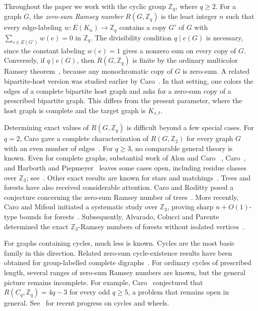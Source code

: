﻿\documentclass[11pt]{article}
\numberwithin{equation}{section}
\theoremstyle{remark}
\newcommand{\Z}{\mathbb Z}
\begin{document}
Throughout the paper we work with the cyclic group \(\Z_q\), where \(q\ge2\).
For a graph \(G\), the \emph{zero-sum Ramsey number} \(R(G,\Z_q)\) is the least integer \(n\) such that every edge-labeling $w\colon E(K_n)\to \Z_q$ contains a copy \(G'\) of \(G\) with $\sum_{e\in E(G')}w(e)=0$ in $\Z_q$.
The divisibility condition $q\mid e(G)$ is necessary, since the constant labeling $w(e)=1$ gives a nonzero sum on every copy of $G$.
Conversely, if \(q\mid e(G)\), then \(R(G,\Z_q)\) is finite by the ordinary multicolor Ramsey theorem~\cite{Ramsey1930}, because any monochromatic copy of \(G\) is zero-sum. 
A related bipartite-host version was studied earlier by Caro~\cite{Caro1993Bipartite}. In that setting, one colors the edges of a complete bipartite host graph and asks for a zero-sum copy of a prescribed bipartite graph. This differs from the present parameter, where the host graph is complete and the target graph is \(K_{s,t}\).


Determining exact values of \(R(G,\Z_q)\) is difficult beyond a few special cases.
For $q=2$, Caro gave a complete
characterization of \(R(G,\Z_2)\) for every graph \(G\) with an even number of edges~\cite{Caro1994}.
For \(q\ge3\), no comparable general theory is known.
Even for complete graphs, substantial work of Alon and Caro~\cite{AlonCaro1993} , Caro~\cite{Caro1992Complete,Caro1997}, and Harborth and Piepmeyer~\cite{HarborthPiepmeyer1994,HarborthPiepmeyer1996} leaves some cases open, including residue classes over \(\Z_3\); see~\cite{CaroMifsud2025}.
Other exact results are known for stars and matchings~\cite{BD1992,Caro1992Stars}. 
Trees and forests have also received considerable attention.
Caro and Roditty posed a conjecture concerning the zero-sum Ramsey number of trees~\cite{CaroRoditty1995}.
More recently, Caro and Mifsud initiated a systematic study over \(\Z_3\), proving sharp \(n+O(1)\)-type bounds for forests~\cite{CaroMifsud2025}.
Subsequently, Alvarado, Colucci and Parente determined the exact \(\Z_3\)-Ramsey numbers of forests without isolated vertices~\cite{AlvaradoColucciParente2025}.

For graphs containing cycles, much less is known.
Cycles are the most basic family in this direction.
Related zero-sum cycle-existence results have been obtained for group-labelled complete digraphs~\cite{LetzterMorrison2024}.
For ordinary cycles of prescribed length, several ranges of zero-sum Ramsey numbers are known, but the general picture remains incomplete.
For example, Caro~\cite{Caro1992Complete,Caro1996} conjectured that \(R(C_q,\Z_q)=4q-3\) for every odd \(q\ge5\), a problem that remains open in general.
See~\cite{ChiHeCyclesWheels2026,HeathSimmons2026} for recent progress on cycles and wheels.
\end{document}
